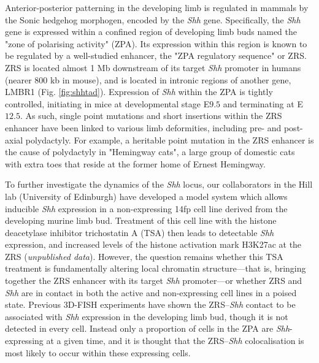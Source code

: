 \documentclass[a4paper,11pt,oneside]{book}
\begin{document}

Anterior-posterior patterning in the developing limb is regulated in mammals by the Sonic hedgehog morphogen, encoded by the \emph{Shh} gene.\cite{Anderson2012} Specifically, the \emph{Shh} gene is expressed within a confined region of developing limb buds named the "zone of polarising activity" (ZPA). Its expression within this region is known to be regulated by a well-studied enhancer, the "ZPA regulatory sequence" or ZRS.\cite{Hill2013a} ZRS is located almost 1 Mb downstream of its target \emph{Shh} promoter in humans (nearer 800 kb in mouse), and is located in intronic regions of another gene, LMBR1 (Fig. \ref{fig:shhtad}).\cite{Hill2013a, Laurell2012} Expression of \emph{Shh} within the ZPA is tightly controlled, initiating in mice at developmental stage E$9.5$ and terminating at E$12.5$.\cite{Amano2009} As such, single point mutations and short insertions within the ZRS enhancer have been linked to various limb deformities, including pre- and post-axial polydactyly.\cite{Anderson2012, Lettice2008, Laurell2012} For example, a heritable point mutation in the ZRS enhancer is the cause of polydactyly in "Hemingway cats", a large group of domestic cats with extra toes that reside at the former home of Ernest Hemingway.\cite{Lettice2008, Zeller2009}  

To further investigate the dynamics of the \emph{Shh} locus, our collaborators in the Hill lab (University of Edinburgh) have developed a model system which allows inducible \emph{Shh} expression in a non-expressing 14fp cell line derived from the developing murine limb bud. Treatment of this cell line with the histone deacetylase inhibitor trichostatin A (TSA) then leads to detectable \emph{Shh} expression, and increased levels of the histone activation mark H3K27ac at the ZRS (\emph{unpublished data}). However, the question remains whether this TSA treatment is fundamentally altering local chromatin structure---that is, bringing together the ZRS enhancer with its target \emph{Shh} promoter---or whether ZRS and \emph{Shh} are in contact in both the active and non-expressing cell lines in a poised state. Previous 3D-FISH experiments have shown the ZRS--\emph{Shh} contact  to be associated with \emph{Shh} expression in the developing limb bud, though it is not detected in every cell.\cite{Amano2009, Hill2013a} Instead only a proportion of cells in the ZPA are \emph{Shh}-expressing at a given time, and it is thought that the ZRS--\emph{Shh} colocalisation is most likely to occur within these expressing cells.\cite{Amano2009}
\end{document}
